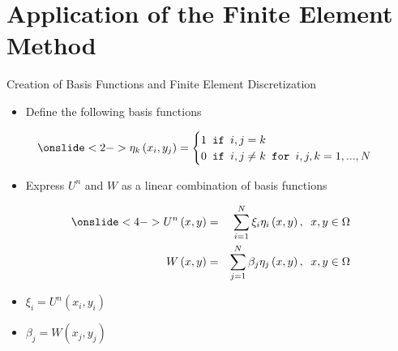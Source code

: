 \documentclass[10pt]{beamer}
\begin{document}
\section{Application of the Finite Element Method}
\begin{frame}{Creation of Basis Functions and Finite Element Discretization} \label{basisfunctionandfinite}
\begin{itemize}
\item<1-> Define the following basis functions
\end{itemize}
$$\onslide<2->
\eta_{k}\left(x_{i},y_{j}\right)=\begin{cases}
1 \texttt{ if } i,j=k\\
0 \texttt{ if } i,j \neq k \texttt{ for } i,j,k=1,...,N
\end{cases} 
$$

\begin{itemize}
\item<3-> Express $U^{n}$ and $W$ as a linear combination of basis functions
\end{itemize}

\begin{eqnarray}\label{UWdiscrete}\onslide<4->
U^{n}\left(x,y\right)&=&\sum_{i=1}^{N}\xi_{i}\eta_{i}\left(x,y\right), \texttt{ } x,y \in \Omega \\
\nonumber
W\left(x,y\right)&=&\sum_{j=1}^{N}\beta_{j}\eta_{j}\left(x,y\right), \texttt{ } x,y \in \Omega
\end{eqnarray}

\begin{itemize}
\item<5-> $\xi_{i}=U^{n}\left(x_{i},y_{i}\right)$
\item<6-> $\beta_{j}=W\left(x_{j},y_{j}\right)$
\end{itemize}
\hyperlink{Questions}{}
\end{frame}
\end{document}
